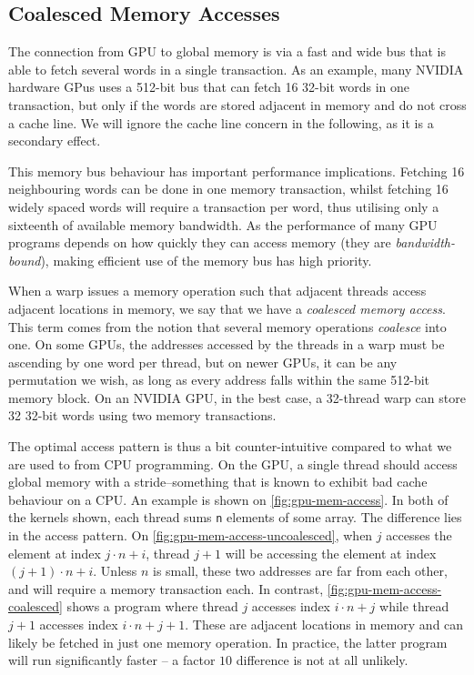 \subsection{Coalesced Memory Accesses}
\label{sec:gpu-coalesced}

The connection from GPU to global memory is via a fast and wide bus
that is able to fetch several words in a single transaction.  As an
example, many NVIDIA hardware GPus uses a 512-bit bus that can fetch
16 32-bit words in one transaction, but only if the words are stored
adjacent in memory and do not cross a cache line.  We will ignore the
cache line concern in the following, as it is a secondary effect.

This memory bus behaviour has important performance implications.
Fetching 16 neighbouring words can be done in one memory transaction,
whilst fetching 16 widely spaced words will require a transaction per
word, thus utilising only a sixteenth of available memory bandwidth.
As the performance of many GPU programs depends on how quickly they
can access memory (they are \textit{bandwidth-bound}), making
efficient use of the memory bus has high priority.

When a warp issues a memory operation such that adjacent threads
access adjacent locations in memory, we say that we have a
\textit{coalesced memory access}.  This term comes from the notion
that several memory operations \textit{coalesce} into one.  On some
GPUs, the addresses accessed by the threads in a warp must be
ascending by one word per thread, but on newer GPUs, it can be any
permutation we wish, as long as every address falls within the same
512-bit memory block.  On an NVIDIA GPU, in the best case, a 32-thread
warp can store 32 32-bit words using two memory transactions.

The optimal access pattern is thus a bit counter-intuitive compared to
what we are used to from CPU programming.  On the GPU, a single thread
should access global memory with a stride--something that is known to
exhibit bad cache behaviour on a CPU.  An example is shown on
\cref{fig:gpu-mem-access}.  In both of the kernels shown, each
thread sums \texttt{n} elements of some array.  The difference lies in
the access pattern.  On \cref{fig:gpu-mem-access-uncoalesced},
when $j$ accesses the element at index $j\cdot{}n+i$, thread $j+1$
will be accessing the element at index $(j+1)\cdot{}n+i$.  Unless $n$
is small, these two addresses are far from each other, and will
require a memory transaction each.  In contrast,
\cref{fig:gpu-mem-access-coalesced} shows a program where
thread $j$ accesses index $i\cdot{}n + j$ while thread $j+1$ accesses
index $i\cdot{}n + j + 1$.  These are adjacent locations in memory and
can likely be fetched in just one memory operation.  In practice, the
latter program will run significantly faster -- a factor $10$
difference is not at all unlikely.

